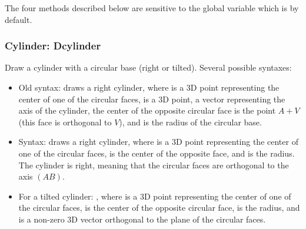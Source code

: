 The four methods described below are sensitive to the global variable  which is \false by default.

\subsubsection{Cylinder: Dcylinder}

Draw a cylinder with a circular base (right or tilted). Several possible syntaxes:
\begin{itemize}
    \item Old syntax:  draws a right cylinder, where  is a 3D point representing the center of one of the circular faces,  is a 3D point, a vector representing the axis of the cylinder, the center of the opposite circular face is the point $A+V$ (this face is orthogonal to $V$), and  is the radius of the circular base.

    \item Syntax:  draws a right cylinder, where  is a 3D point representing the center of one of the circular faces,  is the center of the opposite face, and  is the radius. The cylinder is right, meaning that the circular faces are orthogonal to the axis $(AB)$.

    \item For a tilted cylinder: , where  is a 3D point representing the center of one of the circular faces,  is the center of the opposite circular face,  is the radius, and  is a non-zero 3D vector orthogonal to the plane of the circular faces.
\end{itemize}

